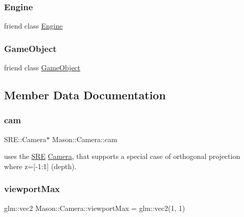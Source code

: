 \subsubsection{\texorpdfstring{Engine}{Engine}}
{\footnotesize\ttfamily friend class \hyperlink{class_mason_1_1_engine}{Engine}\hspace{0.3cm}{\ttfamily [friend]}}

\hypertarget{class_mason_1_1_camera_a00df87c957d8f7ee0fc51f07a0542f4a}{}\label{class_mason_1_1_camera_a00df87c957d8f7ee0fc51f07a0542f4a} 
\subsubsection{\texorpdfstring{Game\+Object}{GameObject}}
{\footnotesize\ttfamily friend class \hyperlink{class_mason_1_1_game_object}{Game\+Object}\hspace{0.3cm}{\ttfamily [friend]}}



\subsection{Member Data Documentation}
\hypertarget{class_mason_1_1_camera_a74f870fa866086c21f28f0a1f59254cc}{}\label{class_mason_1_1_camera_a74f870fa866086c21f28f0a1f59254cc} 
\subsubsection{\texorpdfstring{cam}{cam}}
{\footnotesize\ttfamily S\+R\+E\+::\+Camera$\ast$ Mason\+::\+Camera\+::cam\hspace{0.3cm}{\ttfamily [protected]}}



uses the \hyperlink{namespace_s_r_e}{S\+RE} \hyperlink{class_mason_1_1_camera}{Camera}, that supports a special case of orthogonal projection where z=\mbox{[}-\/1\+:1\mbox{]} (depth). 

\hypertarget{class_mason_1_1_camera_a8c7510e4c83e123aebbe7bb36da80de9}{}\label{class_mason_1_1_camera_a8c7510e4c83e123aebbe7bb36da80de9} 
\subsubsection{\texorpdfstring{viewport\+Max}{viewportMax}}
{\footnotesize\ttfamily glm\+::vec2 Mason\+::\+Camera\+::viewport\+Max = glm\+::vec2(1, 1)\hspace{0.3cm}{\ttfamily [protected]}}



